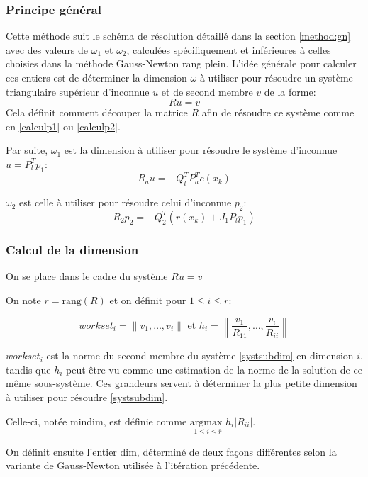 \documentclass[a4paper,11pt]{article}
\numberwithin{equation}{section}
\begin{document}
\subsubsection{Principe général}


Cette méthode suit le schéma de résolution détaillé dans la section \ref{method:gn} avec des valeurs de $\omega_{1}$ et $\omega_{2}$, calculées spécifiquement et inférieures à celles choisies dans la méthode Gauss-Newton rang plein. L'idée générale pour calculer ces entiers est de déterminer la dimension $\omega$ à utiliser pour résoudre un système triangulaire supérieur d'inconnue $u$ et de second membre $v$ de la forme: 
\begin{equation} \label{systsubdim}
Ru=v
\end{equation}
Cela définit comment découper la matrice $R$ afin de résoudre ce système comme en \ref{calculp1} ou \ref{calculp2}.

Par suite, $\omega_{1}$ est la dimension à utiliser pour résoudre le système d'inconnue $u=P_l^{T}p_1$: $$R_{a}u = -Q_l^TP_{a}^Tc(x_{k})$$

 $\omega_{2}$ est celle à utiliser pour résoudre celui d'inconnue $p_{2}$: $$R_{2}p_2 = -Q_2^T(r(x_{k}) + J_1P_lp_1)$$ 
 
 \subsubsection{Calcul de la dimension}
 
 On se place dans le cadre du système $Ru=v$
 
 On note $\bar{r}=\text{rang}(R)$ et on définit pour $1\leq i \leq \bar{r}$:
\newcommand{\ws}{workset}
 
 $$\ws_{i} = \|v_{1},\ldots, v_{i}\| \text{ et } h_{i}=\left \|\frac{v_{1}}{R_{11}},\ldots,\frac{v_{i}}{R_{ii}} \right \|$$
 
 $\ws_{i}$ est la norme du second membre du système \ref{systsubdim} en dimension $i$, tandis que $h_{i}$ peut être vu comme une estimation de la norme de la solution de ce même sous-système. Ces grandeurs servent à déterminer la plus petite dimension à utiliser pour résoudre \ref{systsubdim}.
 
 Celle-ci, notée $\text{mindim}$, est définie comme $\underset{1\leq i \leq \bar{r}}{\text{argmax }} h_{i}|R_{ii}|$.
 
On définit ensuite l'entier dim, déterminé de deux fa\c cons différentes selon la variante de Gauss-Newton utilisée à l'itération précédente.
\end{document}
